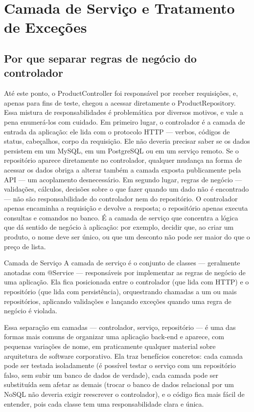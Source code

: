 \chapter{Camada de Serviço e Tratamento de Exceções}

\section{Por que separar regras de negócio do controlador}

Até este ponto, o ProductController foi responsável por receber requisições, e, apenas para fins de teste, chegou a acessar diretamente o ProductRepository. Essa mistura de responsabilidades é problemática por diversos motivos, e vale a pena enumerá-los com cuidado. Em primeiro lugar, o controlador é a camada de entrada da aplicação: ele lida com o protocolo HTTP — verbos, códigos de status, cabeçalhos, corpo da requisição. Ele não deveria precisar saber se os dados persistem em um MySQL, em um PostgreSQL ou em um serviço remoto. Se o repositório aparece diretamente no controlador, qualquer mudança na forma de acessar os dados obriga a alterar também a camada exposta publicamente pela API — um acoplamento desnecessário. Em segundo lugar, regras de negócio — validações, cálculos, decisões sobre o que fazer quando um dado não é encontrado — não são responsabilidade do controlador nem do repositório. O controlador apenas encaminha a requisição e devolve a resposta; o repositório apenas executa consultas e comandos no banco. É a camada de serviço que concentra a lógica que dá sentido de negócio à aplicação: por exemplo, decidir que, ao criar um produto, o nome deve ser único, ou que um desconto não pode ser maior do que o preço de lista.

Camada de Serviço A camada de serviço é o conjunto de classes — geralmente anotadas com @Service — responsáveis por implementar as regras de negócio de uma aplicação. Ela fica posicionada entre o controlador (que lida com HTTP) e o repositório (que lida com persistência), orquestrando chamadas a um ou mais repositórios, aplicando validações e lançando exceções quando uma regra de negócio é violada.

Essa separação em camadas — controlador, serviço, repositório — é uma das formas mais comuns de organizar uma aplicação back-end e aparece, com pequenas variações de nome, em praticamente qualquer material sobre arquitetura de software corporativo. Ela traz benefícios concretos: cada camada pode ser testada isoladamente (é possível testar o serviço com um repositório falso, sem subir um banco de dados de verdade), cada camada pode ser substituída sem afetar as demais (trocar o banco de dados relacional por um NoSQL não deveria exigir reescrever o controlador), e o código fica mais fácil de entender, pois cada classe tem uma responsabilidade clara e única.

